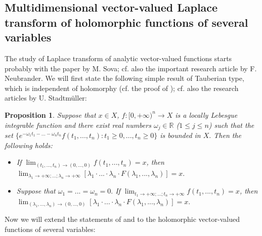 \documentclass{amsart}
\newtheorem{prop}[thm]{Proposition}
\theoremstyle{definition}
\theoremstyle{remark}
\numberwithin{equation}{section}
\begin{document}
\subsection{Multidimensional vector-valued Laplace transform of holomorphic functions of several variables}\label{neubrander}

The study of Laplace transform of analytic vector-valued functions starts probably with the paper \cite{sova}
by M. Sova; cf. also the important research article \cite{frank} by F. Neubrander. We will first state
the following simple result of Tauberian type, which is independent of holomorphy (cf. the proof of \cite[Theorem 2.6.4, p. 89]{a43}); cf. also the research articles \cite{tauber01,tauber021} by U. Stadtm\"uller:

\begin{prop}\label{tauber}
Suppose that $x\in X$, $f: [0,+\infty)^{n}\rightarrow X$ is a locally Lebesgue integrable function and there exist real numbers $\omega_{j} \in {\mathbb R}$ ($1\leq j\leq n$) such that the set $\{ e^{-\omega_{1}t_{1}-...-\omega_{n}t_{n}}f(t_{1},...,t_{n}) : t_{1}\geq 0,...,t_{n}\geq 0 \}$ is bounded in $X.$ Then the following holds:
\begin{itemize}
\item[(i)] If $\lim_{(t_{1},...,t_{n})\rightarrow (0,...,0)}f(t_{1},...,t_{n})=x$, then\\ $\lim_{\lambda_{1}\rightarrow +\infty;...;\lambda_{n}\rightarrow +\infty}[\lambda_{1}\cdot ... \cdot \lambda_{n}\cdot F(\lambda_{1},...,\lambda_{n})]=x.$
\item[(ii)] Suppose that $\omega_{1}=...=\omega_{n}=0.$ If $\lim_{t_{1}\rightarrow +\infty;...;t_{n}\rightarrow +\infty}f(t_{1},...,t_{n})=x$, then $\lim_{(\lambda_{1},...,\lambda_{n}) \rightarrow (0,...,0)}[\lambda_{1}\cdot ... \cdot \lambda_{n}\cdot  F(\lambda_{1},...,\lambda_{n})]=x.$
\end{itemize}
\end{prop}

Now we will extend the statements of \cite[Proposition 2.6.3]{a43} and \cite[Theorem 1.4.10(ii)]{FKP} to the holomorphic vector-valued functions of several variables:
\end{document}

